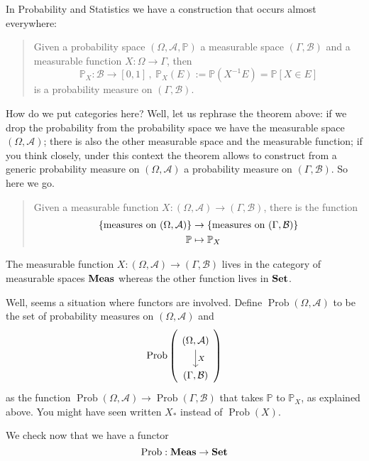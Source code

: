 \begin{example}
  In Probability and Statistics we have a construction that occurs
  almost everywhere:
  \begin{quotation}
    Given a probability space \((\Omega, \mathcal{A},\mathbb{P})\) a
    measurable space \((\Gamma, \mathcal{B})\) and a measurable
    function \(X : \Omega \to \Gamma\), then
    \[
      \mathbb{P}_X : \mathcal{B} \to [0,1] \,,\ \mathbb{P}_X(E) :=
      \mathbb{P}\left(X^{-1}E\right) = \mathbb{P}[X \in E]
    \]
    is a probability measure on \((\Gamma, \mathcal{B})\).
  \end{quotation}
  How do we put categories here? Well, let us rephrase the theorem
  above: if we drop the probability from the probability space we have
  the measurable space \((\Omega, \mathcal{A})\); there is also the
  other measurable space and the measurable function; if you think
  closely, under this context the theorem allows to construct from a
  generic probability measure on \((\Omega, \mathcal{A})\) a
  probability measure on \((\Gamma, \mathcal{B})\). So here we go.
  \begin{quotation}
    Given a measurable function
    \(X : (\Omega, \mathcal{A}) \to (\Gamma, \mathcal{B})\), there is
    the function
    \begin{align*}
      \left\{\text{measures on } (\Omega, \mathcal{A})\right\} & \to \left\{\text{measures on }
                                                        (\Gamma, \mathcal{B})\right\} \\
      \mathbb{P} & \mapsto \mathbb{P}_X
    \end{align*}
  \end{quotation}
  The measurable function
  \(X : (\Omega, \mathcal{A}) \to (\Gamma, \mathcal{B})\) lives in the
  category of measurable spaces \(\mathbf{Meas}\) whereas the other function
  lives in \(\mathbf{Set}\).

  Well, seems a situation where functors are involved. Define
  \(\operatorname{Prob}(\Omega, \mathcal{A})\) to be the set of
  probability measures on \((\Omega, \mathcal{A})\) and
  \[
    \operatorname{Prob} \left(
      \begin{tikzcd}
        (\Omega, \mathcal{A}) \ar["X", d] \\ (\Gamma, \mathcal{B})
      \end{tikzcd}
    \right)
  \]
  as the function
  \(\operatorname{Prob}(\Omega, \mathcal{A}) \to
  \operatorname{Prob}(\Gamma, \mathcal{B})\) that takes \(\mathbb{P}\)
  to \(\mathbb{P}_X\), as explained above. You might have seen written
  \(X_\ast\) instead of \(\operatorname{Prob}(X)\).

  We check now that we have a functor
  \[
    \operatorname{Prob} : \mathbf{Meas} \to \mathbf{Set}
  \]
\end{example}

